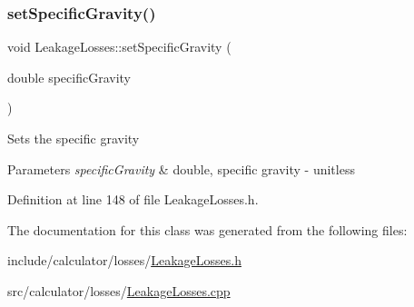 \subsubsection{\texorpdfstring{set\+Specific\+Gravity()}{setSpecificGravity()}}
{\footnotesize\ttfamily void Leakage\+Losses\+::set\+Specific\+Gravity (\begin{DoxyParamCaption}\item[{double}]{specific\+Gravity }\end{DoxyParamCaption})\hspace{0.3cm}{\ttfamily [inline]}}

Sets the specific gravity 
\begin{DoxyParams}{Parameters}
{\em specific\+Gravity} & double, specific gravity -\/ unitless \\
\hline
\end{DoxyParams}


Definition at line 148 of file Leakage\+Losses.\+h.



The documentation for this class was generated from the following files\+:\begin{DoxyCompactItemize}
\item 
include/calculator/losses/\hyperlink{_leakage_losses_8h}{Leakage\+Losses.\+h}\item 
src/calculator/losses/\hyperlink{_leakage_losses_8cpp}{Leakage\+Losses.\+cpp}\end{DoxyCompactItemize}
